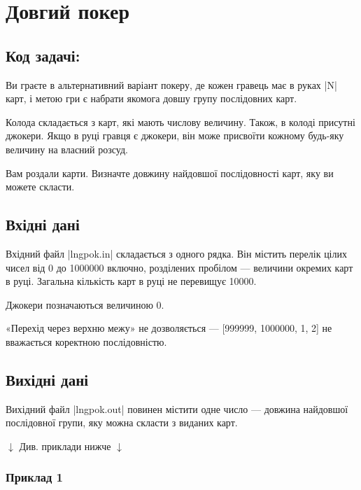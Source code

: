 \documentclass[12pt,a4paper]{article}
\begin{document}
\section*{Довгий покер \hfill {}}


\subsection*{Код задачі: }

Ви граєте в альтернативний варіант покеру, де кожен гравець має в руках |N| карт, і метою гри є набрати якомога довшу групу послідовних карт.

Колода складається з карт, які мають числову величину.
Також, в колоді присутні джокери.
Якщо в руці гравця є джокери, він може присвоїти кожному будь-яку величину на власний розсуд.

Вам роздали карти.
Визначте довжину найдовшої послідовності карт, яку ви можете скласти.

\subsection*{Вхідні дані}

Вхідний файл |lngpok.in| складається з одного рядка.
Він містить перелік цілих чисел від 0 до 1000000 включно, розділених пробілом --- величини окремих карт в руці.
Загальна кількість карт в руці не перевищує 10000.

Джокери позначаються величиною 0.

«Перехід через верхню межу» не дозволяється --- [999999, 1000000, 1, 2] не вважається коректною послідовністю.


\subsection*{Вихідні дані}

Вихідний файл |lngpok.out| повинен містити одне число --- довжина найдовшої послідовної групи, яку можна скласти з виданих карт.


\begin{pagebottomtext}
$\downarrow$ Див. приклади нижче $\downarrow$
\end{pagebottomtext}


\pagebreak


\subsubsection*{Приклад 1}
\end{document}
